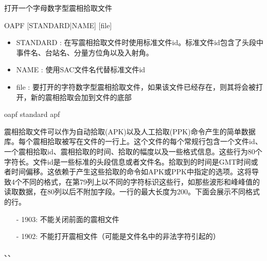 \label{cmd:oapf}

打开一个字母数字型震相拾取文件

\begin{SACSTX}
OAPF [STANDARD|NAME] [file]
\end{SACSTX}

\begin{itemize}
\item STANDARD : 在写震相拾取文件时使用标准文件id。标准文件id包含了头段中事件名、台站名、分量方位角以及入射角。 
\item NAME : 使用SAC文件名代替标准文件id 
\item file : 要打开的字符数字型震相拾取文件，如果该文件已经存在，则其将会被打开，新的震相拾取会加到文件的底部 
\end{itemize}

\begin{SACDFT}
oapf standard apf
\end{SACDFT}

震相拾取文件可以作为自动拾取(APK)以及人工拾取(PPK)命令产生的简单数据库。每个震相拾取被写在文件的一行上。这个文件的每个常规行包含一个文件id、一个震相拾取id、震相拾取的时间、拾取的幅度以及一些格式信息。这些行为80个字符长。文件id是一些标准的头段信息或者文件名。拾取到的时间是GMT时间或者时间偏移。这依赖于产生这些拾取的命令如APK或PPK中指定的选项。这将导致4个不同的格式，在第79列上以不同的字符标识这些行，如那些波形和峰峰值的读取数据，在80列以后不附加字段。一行的最大长度为200。下面会展示不同格式的行。

\begin{itemize}
\item[-]1903: 不能关闭前面的震相文件
\item[-]1902: 不能打开震相文件（可能是文件名中的非法字符引起的）
\end{itemize}

、、
